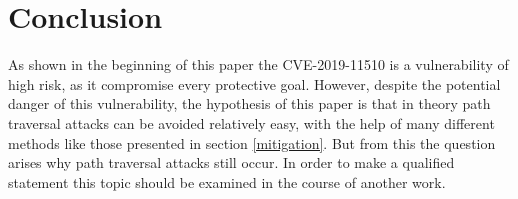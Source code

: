 
\section{Conclusion}

As shown in the beginning of this paper the CVE-2019-11510 is a vulnerability of high risk, as it compromise every protective goal. However, despite the potential danger of this vulnerability, the hypothesis of this paper is that in theory path traversal attacks can be avoided relatively easy, with the help of many different methods like those presented in section \ref{mitigation}. But from this the question arises why path traversal attacks still occur. In order to make a qualified statement this topic should be examined in the course of another work.




